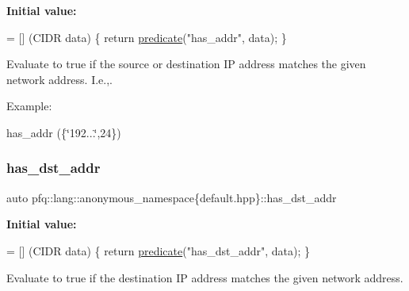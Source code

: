 {\bfseries Initial value\+:}
\begin{DoxyCode}
= [] (CIDR data)
        \{
            \textcolor{keywordflow}{return} \hyperlink{namespacepfq_1_1lang_aca9adafc436b7f851621b979fa1aaf88}{predicate}(\textcolor{stringliteral}{"has\_addr"}, data);
        \}
\end{DoxyCode}


Evaluate to {\ttfamily true} if the source or destination IP address matches the given network address. I.\+e.,. 

Example\+:

has\+\_\+addr (\{\char`\"{}192...\char`\"{},24\}) \mbox{\label{namespacepfq_1_1lang_1_1anonymous__namespace_02default_8hpp_03_a0a53822af0ed8ea341f16a1da5ea83e3}} 
\subsubsection{\texorpdfstring{has\+\_\+dst\+\_\+addr}{has\_dst\_addr}}
{\footnotesize\ttfamily auto pfq\+::lang\+::anonymous\+\_\+namespace\{default.\+hpp\}\+::has\+\_\+dst\+\_\+addr}

{\bfseries Initial value\+:}
\begin{DoxyCode}
= [] (CIDR data)
        \{
            \textcolor{keywordflow}{return} \hyperlink{namespacepfq_1_1lang_aca9adafc436b7f851621b979fa1aaf88}{predicate}(\textcolor{stringliteral}{"has\_dst\_addr"}, data);
        \}
\end{DoxyCode}


Evaluate to {\ttfamily true} if the destination IP address matches the given network address. 

\mbox{\label{namespacepfq_1_1lang_1_1anonymous__namespace_02default_8hpp_03_afa71ece0f4178d0200c0388f503eef14}} 
